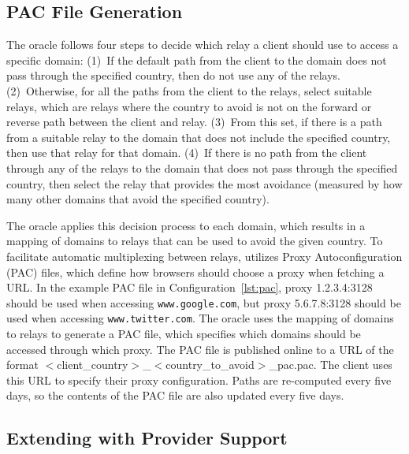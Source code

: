 \subsection{PAC File Generation}
\label{multiplex}
The oracle follows four steps to decide which relay a client should
use to access a specific domain: (1)~If the default path from the
client to the domain does not pass through the specified country, then
do not use any of the relays.  (2)~Otherwise, for all the paths from
the client to the relays, select suitable relays, which are relays where the country 
to avoid is not on the forward or reverse path between the client and 
relay.  (3)~From this set, if there
is a path from a suitable relay to the domain that does not include
the specified country, then use that relay for that domain.  (4)~If
there is no path from the client through any of the relays to the
domain that does not pass through the specified country, then select
the relay that provides the most avoidance (measured by how many other
domains that avoid the specified country).
\begin{figure}[t]
\renewcommand{\lstlistingname}{Configuration}

\vspace*{-0.25in}
\end{figure}
The oracle applies this decision process to each domain, which results
in a mapping of domains to relays that can be used to avoid the given
country.  To facilitate automatic multiplexing between relays,
\system{} utilizes Proxy Autoconfiguration (PAC) files, which define
how browsers should choose a proxy when fetching a URL.  In the
example PAC file in Configuration~\ref{lst:pac}, proxy 1.2.3.4:3128
should be used when accessing {\tt www.google.com}, but proxy
5.6.7.8:3128 should be used when accessing {\tt www.twitter.com}.  The
oracle uses the mapping of domains to relays to generate a PAC file,
which specifies which domains should be accessed through which proxy.
The PAC file is published online to a URL of the format
$<$client\_country$>$\_$<$country\_to\_avoid$>$\_pac.pac.  The client
uses this URL to specify their proxy configuration.  Paths are
re-computed every five days, so the contents of the PAC file are also
updated every five days.

\subsection{Extending \system{} with Provider Support}

